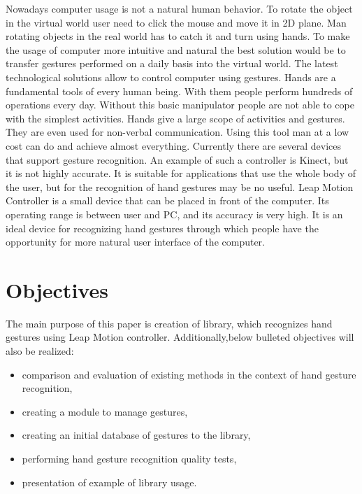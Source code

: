 Nowadays computer usage is not a natural human behavior. To rotate the object in the virtual world user need to click the mouse and move it in 2D plane. Man rotating objects in the real world has to catch it and turn using hands. To make the usage of computer more intuitive and natural the best solution would be to transfer gestures performed on a daily basis into the virtual world. The latest technological solutions allow to control computer using gestures.
Hands are a fundamental tools of every human being. With them people perform hundreds of operations every day. Without this basic manipulator people are not able to cope with the simplest activities. Hands give a large scope of activities and gestures. They are even used for non-verbal communication. Using this tool man at a low cost can do and achieve almost everything.
Currently there are several devices that support gesture recognition. An example of such a controller is Kinect, but it is not highly accurate. It is suitable for applications that use the whole body of the user, but for the recognition of hand gestures may be no useful. Leap Motion Controller is a small device that can be placed in front of the computer. Its operating range is between user and PC, and its accuracy is very high. It is an ideal device for recognizing hand gestures through which people have the opportunity for more natural user interface of the computer.

\section{Objectives}

The main purpose of this paper is creation of library, which recognizes hand gestures using Leap Motion controller.
Additionally,below bulleted objectives will also be realized:
\begin{itemize}
\item comparison and evaluation of existing methods in the context of hand gesture recognition,
\item creating a module to manage gestures,
\item creating an initial database of gestures to the library,
\item performing hand gesture recognition quality tests,
\item presentation of example of library usage.
\end{itemize}

